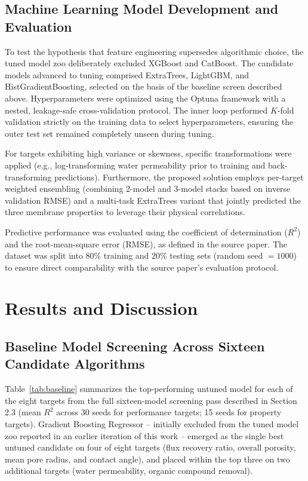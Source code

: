 \documentclass[11pt]{article}
\begin{document}
\subsection{Machine Learning Model Development and Evaluation}

To test the hypothesis that feature engineering supersedes algorithmic choice, the tuned model zoo deliberately excluded XGBoost and CatBoost. The candidate models advanced to tuning comprised ExtraTrees, LightGBM, and HistGradientBoosting, selected on the basis of the baseline screen described above. Hyperparameters were optimized using the Optuna framework with a nested, leakage-safe cross-validation protocol. The inner loop performed $K$-fold validation strictly on the training data to select hyperparameters, ensuring the outer test set remained completely unseen during tuning.

For targets exhibiting high variance or skewness, specific transformations were applied (e.g., log-transforming water permeability prior to training and back-transforming predictions). Furthermore, the proposed solution employs per-target weighted ensembling (combining 2-model and 3-model stacks based on inverse validation RMSE) and a multi-task ExtraTrees variant that jointly predicted the three membrane properties to leverage their physical correlations.

Predictive performance was evaluated using the coefficient of determination ($R^2$) and the root-mean-square error (RMSE), as defined in the source paper. The dataset was split into 80\% training and 20\% testing sets (random seed $= 1000$) to ensure direct comparability with the source paper's evaluation protocol.

\section{Results and Discussion}

\subsection{Baseline Model Screening Across Sixteen Candidate Algorithms}

Table~\ref{tab:baseline} summarizes the top-performing untuned model for each of the eight targets from the full sixteen-model screening pass described in Section 2.3 (mean $R^2$ across 30 seeds for performance targets; 15 seeds for property targets). Gradient Boosting Regressor -- initially excluded from the tuned model zoo reported in an earlier iteration of this work -- emerged as the single best untuned candidate on four of eight targets (flux recovery ratio, overall porosity, mean pore radius, and contact angle), and placed within the top three on two additional targets (water permeability, organic compound removal).
\end{document}
